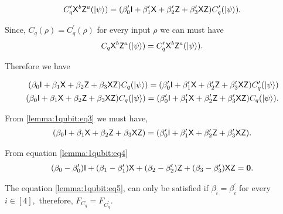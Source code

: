 \begin{equation}
\label{lemma:1qubit:eq2}
\begin{aligned}
 C_q^\prime {\sf X}^b {\sf Z}^a({\lvert}\psi\rangle)=(\beta_0^\prime {\sf I}+\beta_1^\prime {\sf X}+\beta_2^\prime {\sf Z}+\beta_3^\prime {\sf X} {\sf Z})  C_q^\prime ({\lvert}\psi\rangle).
 \end{aligned}
\end{equation}

Since,  $C_q (\rho)=C_q^\prime (\rho)$ for every input $\rho$ we can must have 
\begin{equation}
C_q {\sf X}^b {\sf Z}^a({\lvert}\psi\rangle)= C_q^\prime {\sf X}^b {\sf Z}^a({\lvert}\psi\rangle).
\end{equation}

Therefore we have 

\begin{equation}
\label{lemma:1qubit:eq3}
\begin{aligned}
(\beta_0 {\sf I}+\beta_1 {\sf X}+\beta_2 {\sf Z}+\beta_3 {\sf X} {\sf Z})  C_q ({\lvert}\psi\rangle)=(\beta_0^\prime {\sf I}+\beta_1^\prime {\sf X}+\beta_2^\prime {\sf Z}+\beta_3^\prime {\sf X} {\sf Z})  C_q^\prime ({\lvert}\psi\rangle)\\
(\beta_0 {\sf I}+\beta_1 {\sf X}+\beta_2 {\sf Z}+\beta_3 {\sf X} {\sf Z})  C_q ({\lvert}\psi\rangle)=(\beta_0^\prime {\sf I}+\beta_1^\prime {\sf X}+\beta_2^\prime {\sf Z}+\beta_3^\prime {\sf X} {\sf Z})  C_q({\lvert}\psi\rangle).\\
\end{aligned}
\end{equation}


From \ref{lemma:1qubit:eq3} we must have,
\begin{equation}
\label{lemma:1qubit:eq4}
\begin{aligned}
(\beta_0 {\sf I}+\beta_1 {\sf X}+\beta_2 {\sf Z}+\beta_3 {\sf X} {\sf Z}) =(\beta_0^\prime {\sf I}+\beta_1^\prime {\sf X}+\beta_2^\prime {\sf Z}+\beta_3^\prime {\sf X} {\sf Z}).\\
\end{aligned}
\end{equation}

From equation \ref{lemma:1qubit:eq4}
\begin{equation}
\label{lemma:1qubit:eq5}
\begin{aligned}
(\beta_0-\beta_0^\prime) {\sf I}+(\beta_1 -\beta_1^\prime){\sf X}+(\beta_2-\beta_2^\prime) {\sf Z}+(\beta_3-\beta^\prime_3) {\sf X} {\sf Z}={\bf 0}.
\end{aligned}
\end{equation}

The equation \ref{lemma:1qubit:eq5},  can only be satisfied if $\beta_i = \beta_i^\prime$ for every $i\in[4],$ therefore,  $F_{C_q}=F_{C_q^\prime}.$






